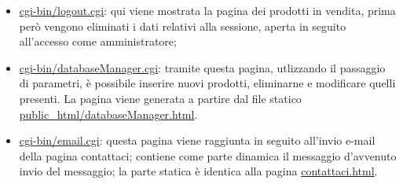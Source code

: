 {\begin{itemize}
		\item \href{http://tecnologie-web.studenti.math.unipd.it/tecweb/~pgabelli/cgi-bin/logout.cgi}{cgi-bin/logout.cgi}: qui viene mostrata la pagina dei prodotti in vendita, prima però vengono eliminati i dati relativi alla sessione, aperta in seguito all'accesso come amministratore;
		\item \href{http://tecnologie-web.studenti.math.unipd.it/tecweb/~pgabelli/cgi-bin/databaseManager.cgi}{cgi-bin/databaseManager.cgi}: tramite questa pagina, utlizzando il passaggio di parametri, è possibile inserire nuovi prodotti, eliminarne e modificare quelli presenti. La pagina viene generata a partire dal file statico \href{http://tecnologie-web.studenti.math.unipd.it/tecweb/~pgabelli/databaseManager.html}{public_html/databaseManager.html}.
		\item \href{http://tecnologie-web.studenti.math.unipd.it/tecweb/~pgabelli/cgi-bin/email.cgi}{cgi-bin/email.cgi}: questa pagina viene raggiunta in seguito all'invio e-mail della pagina contattaci; contiene come parte dinamica il messaggio d'avvenuto invio del messaggio; la parte statica è identica alla pagina \href{http://tecnologie-web.studenti.math.unipd.it/tecweb/~pgabelli/contattaci.html}{contattaci.html}.
	\end{itemize}
}